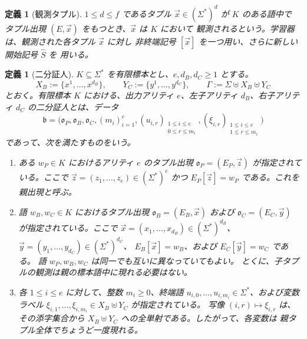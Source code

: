 \documentclass[11pt,a4paper]{ltjsarticle}
\newtheorem{definition}[theorem]{定義}
\theoremstyle{remark}
\newcommand{\tuple}[1]{\vec{#1}}
\begin{document}
\begin{definition}[観測タプル]
\label{def:observed-tuple}
\(1\le d\le f\) であるタプル \(\tuple x\in(\Sigma^*)^d\) が \(K\) のある語中で
タプル出現 \((E,\tuple x)\) をもつとき、\(\tuple x\) は \(K\) において
\emph{観測される}という。学習器は、観測された各タプル \(\tuple x\) に対し
非終端記号 \([\tuple x]\) を一つ用い、さらに新しい開始記号 \(\widehat S\) を
用いる。
\end{definition}

\begin{definition}[二分証人]
\label{def:binary-witness}
\(K\subseteq\Sigma^*\) を有限標本とし、\(e,d_B,d_C\ge1\) とする。
\[
  X_B:=\{x^1,\ldots,x^{d_B}\},\qquad
  Y_C:=\{y^1,\ldots,y^{d_C}\},\qquad
  \Gamma:=\Sigma\uplus X_B\uplus Y_C
\]
とおく。有限標本 \(K\) における、出力アリティ \(e\)、左子アリティ
\(d_B\)、右子アリティ \(d_C\) の\emph{二分証人}とは、データ
\[
  \mathfrak b=\bigl(
    \mathfrak o_P,\mathfrak o_B,\mathfrak o_C,(m_i)_{i=1}^e,
    (u_{i,r})_{\substack{1\le i\le e\\0\le r\le m_i}},
    (\xi_{i,r})_{\substack{1\le i\le e\\1\le r\le m_i}}
  \bigr)
\]
であって、次を満たすものをいう。
\begin{enumerate}[label=(\roman*),leftmargin=*]
\item ある \(w_P\in K\) におけるアリティ \(e\) のタプル出現
      \(\mathfrak o_P=(E_P,\tuple z)\) が指定されている。ここで
      \(\tuple z=(z_1,\ldots,z_e)\in(\Sigma^*)^e\) かつ
      \(E_P[\tuple z]=w_P\) である。これを\emph{親出現}と呼ぶ。

\item 語 \(w_B,w_C\in K\) におけるタプル出現
      \(\mathfrak o_B=(E_B,\tuple x)\) および
      \(\mathfrak o_C=(E_C,\tuple y)\) が指定されている。ここで
      \(\tuple x=(x_1,\ldots,x_{d_B})\in(\Sigma^*)^{d_B}\)、
      \(\tuple y=(y_1,\ldots,y_{d_C})\in(\Sigma^*)^{d_C}\)、
      \(E_B[\tuple x]=w_B\)、および \(E_C[\tuple y]=w_C\) である。
      語 \(w_P,w_B,w_C\) は同一でも互いに異なっていてもよい。
      とくに、子タプルの観測は親の標本語中に現れる必要はない。

\item 各 \(1\le i\le e\) に対して、整数 \(m_i\ge0\)、終端語
      \(u_{i,0},\ldots,u_{i,m_i}\in\Sigma^*\)、および変数ラベル
      \(\xi_{i,1},\ldots,\xi_{i,m_i}\in X_B\uplus Y_C\) が指定されている。
      写像 \((i,r)\mapsto\xi_{i,r}\) は、その添字集合から
      \(X_B\uplus Y_C\) への全単射である。したがって、各変数は
      親タプル全体でちょうど一度現れる。


\end{enumerate}
\end{definition}
\end{document}
